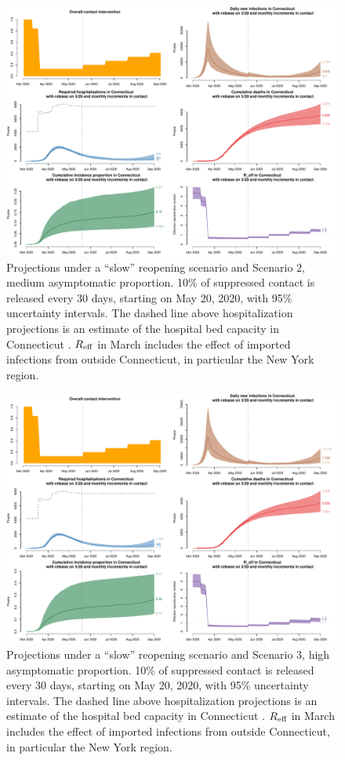 \documentclass[11pt]{article}
\begin{document}
\begin{figure} %
	\centering
	\includegraphics[width=.9\textwidth]{figures/slow_medium_full.pdf}
	\caption{Projections under a ``slow'' reopening scenario and Scenario 2, medium asymptomatic proportion. 10\% of suppressed contact is released every 30 days, starting on May 20, 2020, with 95\% uncertainty intervals. The dashed line above hospitalization projections is an estimate of the hospital bed capacity in Connecticut \citep{CHAwebsite}. $R\textsubscript{eff}$ in March includes the effect of imported infections from outside Connecticut, in particular the New York region.}
	\label{fig:slow_medium}
\end{figure}

\begin{figure} %
	\centering
	\includegraphics[width=.9\textwidth]{figures/slow_high_full.pdf}
	\caption{Projections under a ``slow'' reopening scenario and Scenario 3, high asymptomatic proportion. 10\% of suppressed contact is released every 30 days, starting on May 20, 2020, with 95\% uncertainty intervals. The dashed line above hospitalization projections is an estimate of the hospital bed capacity in Connecticut \citep{CHAwebsite}. $R\textsubscript{eff}$ in March includes the effect of imported infections from outside Connecticut, in particular the New York region.}
	\label{fig:slow_high}
\end{figure}
\end{document}
